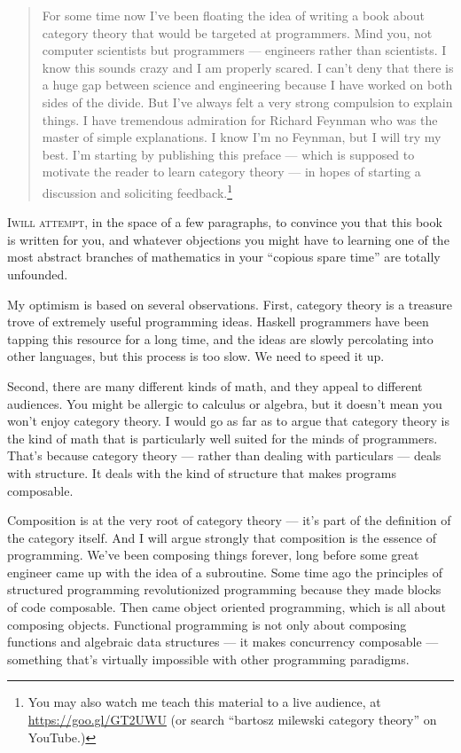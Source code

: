 
\begin{quote}
  For some time now I've been floating the idea of writing a book about
  category theory that would be targeted at programmers. Mind you, not
  computer scientists but programmers --- engineers rather than
  scientists. I know this sounds crazy and I am properly scared. I can't
  deny that there is a huge gap between science and engineering because I
  have worked on both sides of the divide. But I've always felt a very
  strong compulsion to explain things. I have tremendous admiration for
  Richard Feynman who was the master of simple explanations. I know I'm no
  Feynman, but I will try my best. I'm starting by publishing this preface
  --- which is supposed to motivate the reader to learn category theory
  --- in hopes of starting a discussion and soliciting feedback.\footnote{
    You may also watch me teach this material to a live audience, at
    \href{https://goo.gl/GT2UWU}{https://goo.gl/GT2UWU} (or search
    ``bartosz milewski category theory'' on YouTube.)}
\end{quote}

\lettrine[lhang=0.17]{I}{will attempt}, in the space of a few paragraphs,
to convince you that this book is written for you, and whatever
objections you might have to learning one of the most abstract branches
of mathematics in your ``copious spare time'' are totally unfounded.

My optimism is based on several observations. First, category theory is
a treasure trove of extremely useful programming ideas. Haskell
programmers have been tapping this resource for a long time, and the
ideas are slowly percolating into other languages, but this process is
too slow. We need to speed it up.

Second, there are many different kinds of math, and they appeal to
different audiences. You might be allergic to calculus or algebra, but
it doesn't mean you won't enjoy category theory. I would go as far as
to argue that category theory is the kind of math that is particularly
well suited for the minds of programmers. That's because category theory
--- rather than dealing with particulars --- deals with structure. It
deals with the kind of structure that makes programs composable.

Composition is at the very root of category theory --- it's part of the
definition of the category itself. And I will argue strongly that
composition is the essence of programming. We've been composing things
forever, long before some great engineer came up with the idea of a
subroutine. Some time ago the principles of structured programming
revolutionized programming because they made blocks of code composable.
Then came object oriented programming, which is all about composing
objects. Functional programming is not only about composing functions
and algebraic data structures --- it makes concurrency composable ---
something that's virtually impossible with other programming paradigms.

